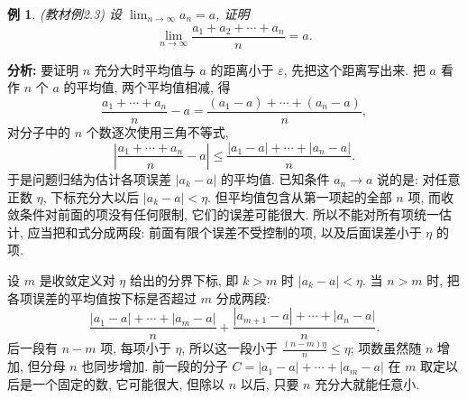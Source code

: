 \documentclass[UTF8,openany]{ctexbook}
\theoremstyle{chinesetextbook}
\newtheorem{example}{例}[section]
\begin{document}
\begin{example}\label{ex:2-3}
\textnormal{(教材例2.3)} 设 $\displaystyle\lim_{n\to\infty}a_n=a$, 证明
\[
\lim_{n\to\infty}\frac{a_1+a_2+\cdots+a_n}n=a.
\]
\end{example}
\par\indent\textbf{分析:} 要证明 $n$ 充分大时平均值与 $a$ 的距离小于 $\varepsilon$, 先把这个距离写出来. 把 $a$ 看作 $n$ 个 $a$ 的平均值, 两个平均值相减, 得
\[
\frac{a_1+\cdots+a_n}n-a=\frac{(a_1-a)+\cdots+(a_n-a)}n,
\]
对分子中的 $n$ 个数逐次使用三角不等式,
\[
\left|\frac{a_1+\cdots+a_n}n-a\right|\le\frac{|a_1-a|+\cdots+|a_n-a|}n.
\]
于是问题归结为估计各项误差 $|a_k-a|$ 的平均值. 已知条件 $a_n\to a$ 说的是: 对任意正数 $\eta$, 下标充分大以后 $|a_k-a|<\eta$. 但平均值包含从第一项起的全部 $n$ 项, 而收敛条件对前面的项没有任何限制, 它们的误差可能很大. 所以不能对所有项统一估计, 应当把和式分成两段: 前面有限个误差不受控制的项, 以及后面误差小于 $\eta$ 的项.

设 $m$ 是收敛定义对 $\eta$ 给出的分界下标, 即 $k>m$ 时 $|a_k-a|<\eta$. 当 $n>m$ 时, 把各项误差的平均值按下标是否超过 $m$ 分成两段:
\[
\frac{|a_1-a|+\cdots+|a_m-a|}n+\frac{|a_{m+1}-a|+\cdots+|a_n-a|}n.
\]
后一段有 $n-m$ 项, 每项小于 $\eta$, 所以这一段小于 $\displaystyle\frac{(n-m)\eta}n\le\eta$; 项数虽然随 $n$ 增加, 但分母 $n$ 也同步增加. 前一段的分子 $C=|a_1-a|+\cdots+|a_m-a|$ 在 $m$ 取定以后是一个固定的数, 它可能很大, 但除以 $n$ 以后, 只要 $n$ 充分大就能任意小.
\end{document}
